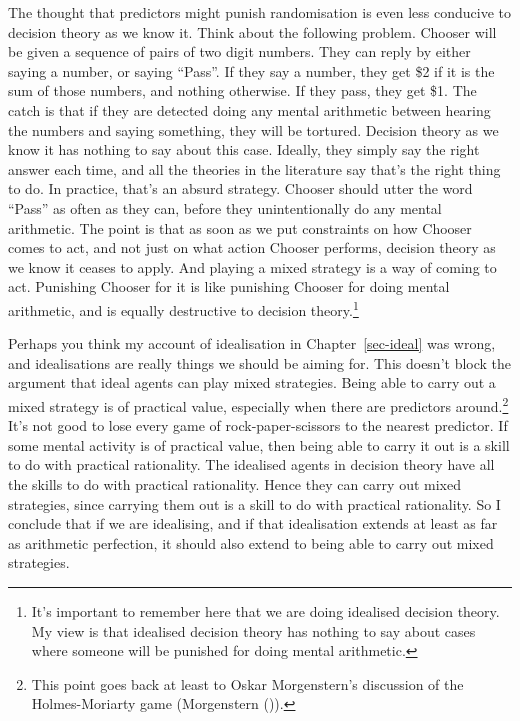\documentclass[
  12pt,
  letterpaper,
  DIV=11,
  numbers=noendperiod]{scrreprt}
\begin{document}
The thought that predictors might punish randomisation is even less
conducive to decision theory as we know it. Think about the following
problem. Chooser will be given a sequence of pairs of two digit numbers.
They can reply by either saying a number, or saying ``Pass''. If they
say a number, they get \$2 if it is the sum of those numbers, and
nothing otherwise. If they pass, they get \$1. The catch is that if they
are detected doing any mental arithmetic between hearing the numbers and
saying something, they will be tortured. Decision theory as we know it
has nothing to say about this case. Ideally, they simply say the right
answer each time, and all the theories in the literature say that's the
right thing to do. In practice, that's an absurd strategy. Chooser
should utter the word ``Pass'' as often as they can, before they
unintentionally do any mental arithmetic. The point is that as soon as
we put constraints on how Chooser comes to act, and not just on what
action Chooser performs, decision theory as we know it ceases to apply.
And playing a mixed strategy is a way of coming to act. Punishing
Chooser for it is like punishing Chooser for doing mental arithmetic,
and is equally destructive to decision theory.\footnote{It's important
  to remember here that we are doing idealised decision theory. My view
  is that idealised decision theory has nothing to say about cases where
  someone will be punished for doing mental arithmetic.}

Perhaps you think my account of idealisation in Chapter~\ref{sec-ideal}
was wrong, and idealisations are really things we should be aiming for.
This doesn't block the argument that ideal agents can play mixed
strategies. Being able to carry out a mixed strategy is of practical
value, especially when there are predictors around.\footnote{This point
  goes back at least to Oskar Morgenstern's discussion of the
  Holmes-Moriarty game (Morgenstern
  ()).} It's not good to lose every
game of rock-paper-scissors to the nearest predictor. If some mental
activity is of practical value, then being able to carry it out is a
skill to do with practical rationality. The idealised agents in decision
theory have all the skills to do with practical rationality. Hence they
can carry out mixed strategies, since carrying them out is a skill to do
with practical rationality. So I conclude that if we are idealising, and
if that idealisation extends at least as far as arithmetic perfection,
it should also extend to being able to carry out mixed strategies.
\end{document}
